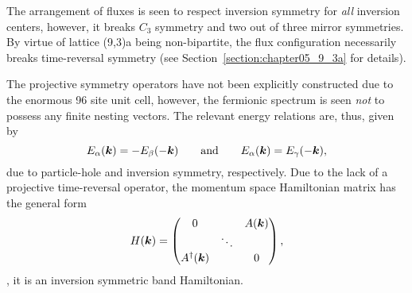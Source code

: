 The arrangement of fluxes is seen to respect inversion symmetry for \textit{all} inversion centers, however, it breaks $C_3$ symmetry and two out of three mirror symmetries.
By virtue of lattice (9,3)a being non-bipartite, the flux configuration necessarily breaks time-reversal symmetry (see Section~\ref{section:chapter05_9_3a} for details).

The projective symmetry operators have not been explicitly constructed due to the enormous 96 site unit cell, however, the fermionic spectrum is seen \textit{not} to possess any finite nesting vectors.
The relevant energy relations are, thus, given by
%
\begin{equation}
	E_{\alpha}(\bm{k}) = -E_{\beta}(-\bm{k}) \qquad {\rm and} \qquad E_{\alpha}(\bm{k}) = E_{\gamma}(-\bm{k}),
\end{equation}
%
due to particle-hole and inversion symmetry, respectively.
Due to the lack of a projective time-reversal operator, the momentum space Hamiltonian matrix has the general form
%
\begin{equation}
	H(\bm{k}) = 
		\begin{pmatrix}
			0			&		 & A(\bm{k}) \\
						& \ddots & 		  \\
			A^{\dagger}(\bm{k})	&		 & 0
		\end{pmatrix},
\end{equation}
%
\ie, it is an inversion symmetric band Hamiltonian.


%
%
